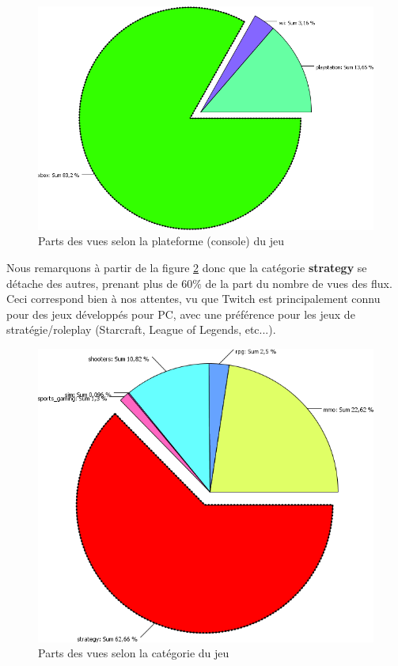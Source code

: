 \documentclass[11pt, a4paper, titlepage]{scrartcl}
\begin{document}
\begin{figure}[h]
    \centering
    \includegraphics[scale=0.4]{images/main_consoles}
    \caption{\label{fig:main_consoles} Parts des vues selon la plateforme
        (console) du jeu}
\end{figure}

Nous remarquons à partir de la figure \ref{fig:main_categories} donc que la
catégorie \textbf{strategy} se détache des autres, prenant plus de $60 \%$ de la
part du nombre de vues des flux. Ceci correspond bien à nos attentes, vu que
Twitch est principalement connu pour des jeux développés pour PC, avec une
préférence pour les jeux de stratégie/roleplay (Starcraft, League of Legends,
etc...).

\begin{figure}[h]
    \centering
    \includegraphics[scale=0.4]{images/main_categories}
    \caption{\label{fig:main_categories} Parts des vues selon la catégorie du
        jeu}
\end{figure}
\end{document}
